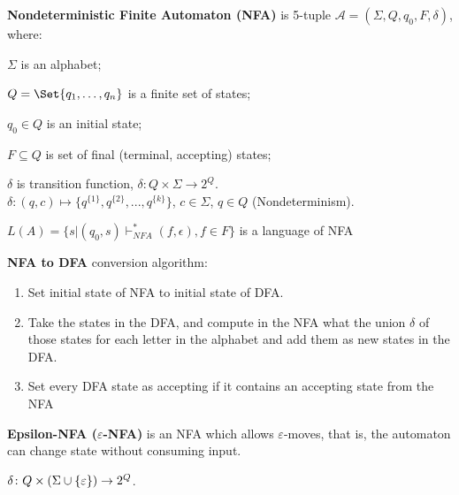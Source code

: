 \documentclass[a4paper,10pt]{article}
\begin{document}
\begin{terms}
\newpage

    \item \textbf{Nondeterministic Finite Automaton (NFA)} is 5-tuple $\mathcal{A} = (\Sigma, Q, q_0, F, \delta)$, where:

    \begin{terms}
        \item $\Sigma$ is an alphabet;

        \item $Q = \Set{q_1, \dots, q_n}$ is a finite set of states;

        \item $q_0 \in Q$ is an initial state;

        \item $F \subseteq Q$ is set of final (terminal, accepting) states;

        \item $\delta$ is transition function, $\delta: Q \times \Sigma \to 2^Q$.\\
        $\delta: (q,c) \mapsto \{q^{\{1\}},q^{\{2\}}, ... , q^{\{k\}}\}$, $c \in \Sigma$, $q \in Q$ (Nondeterminism).

        \item $L(A) = \{ s| (q_0, s) \vdash^*_{NFA} (f, \epsilon), f\in F\}$ is a language of NFA
    \end{terms}

    \item \textbf{NFA to DFA} conversion algorithm:

    \begin{enumerate}
        \item Set initial state of NFA to initial state of DFA.

        \item Take the states in the DFA, and compute in the NFA what the union $\delta$ of those states for each letter in the alphabet and add them as new states in the DFA.

        \item Set every DFA state as accepting if it contains an accepting state from the NFA
    \end{enumerate}

    \item \textbf{Epsilon-NFA ($\varepsilon$-NFA)} is an NFA which allows $\varepsilon$-moves, that is, the automaton can change state without consuming input.

    \begin{terms}
        \item $\delta \colon Q \times (\Sigma \cup \{\varepsilon\}) \to 2^Q$.
    \end{terms}


\end{terms}
\end{document}
